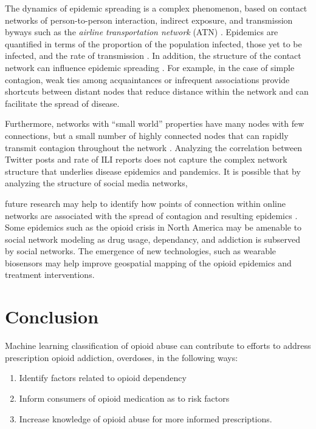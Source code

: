 \documentclass[sigconf]{acmart}
\begin{document}
The dynamics of epidemic spreading is a complex phenomenon, based on contact 
networks of person-to-person interaction, indirect exposure, and transmission 
byways such as the {\it airline transportation network} (ATN) \cite{Colizza06}. 
Epidemics are quantified in terms of the proportion of the population infected, 
those yet to be infected, and the rate of transmission \cite{hethcote00}. In 
addition, the structure of the contact network can influence epidemic spreading 
\cite{pastor01}. For example, in the case of simple contagion, weak ties among 
acquaintances or infrequent associations provide shortcuts between distant nodes 
that reduce distance within the network \cite{granovetter73} and can facilitate 
the spread of disease. 

Furthermore, networks with ``small world'' properties have many nodes with 
few connections, but a small number of highly connected nodes that can rapidly 
transmit contagion throughout the network \cite{watts98}. Analyzing the 
correlation between Twitter posts and rate of ILI reports does not capture the 
complex network structure that underlies disease epidemics and pandemics. 
It is possible that by analyzing the structure of social media networks, 

future research may help to identify how points of connection within online
networks are associated with the spread of contagion and resulting epidemics 
\cite{zhu17}. Some epidemics such as the opioid crisis in North America 
\cite{volkow14} may be amenable to social network modeling as drug usage, 
dependancy, and addiction is subserved by social networks. The emergence of 
new technologies, such as wearable biosensors \cite{carreiro15} may help 
improve geospatial mapping of the opioid epidemics and treatment interventions.

\section{Conclusion}

Machine learning classification of opioid abuse can contribute to efforts to 
address prescription opioid addiction, overdoses, in the following ways: 
\begin{enumerate}
\item Identify factors related to opioid dependency
\item Inform consumers of opioid medication as to risk factors 
\item Increase knowledge of opioid abuse for more informed prescriptions. 
\end{enumerate}
\end{document}
